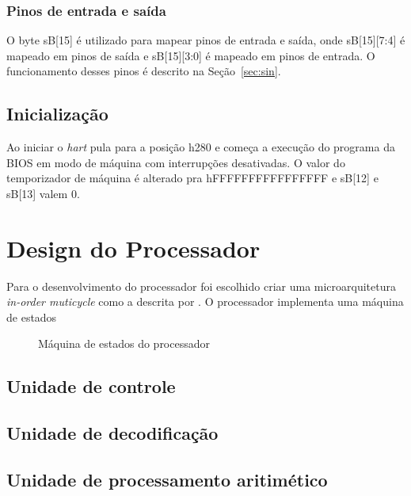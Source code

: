 \subsubsection{Pinos de entrada e saída}
\label{ssec:gpio}

O byte sB[15] é utilizado para mapear pinos de entrada e saída, onde sB[15][7:4] é mapeado em pinos de saída e sB[15][3:0] é mapeado em pinos de entrada.
O funcionamento desses pinos é descrito na Seção~\ref{sec:sin}.

\subsection{Inicialização}
\label{ssec:init}

Ao iniciar o \emph{hart} pula para a posição h280 e começa a execução do programa da BIOS em modo de máquina com interrupções desativadas.
O valor do temporizador de máquina é alterado pra hFFFFFFFFFFFFFFFF e sB[12] e sB[13] valem 0.

\section{Design do Processador}
\label{sec:ddp}

Para o desenvolvimento do processador foi escolhido criar uma microarquitetura \emph{in-order muticycle} como a descrita por \cite{harris2021digital}.
O processador implementa uma máquina de estados 

\begin{figure}
  \centering
  \caption{Máquina de estados do processador}\label{fig:graficos}
\end{figure}

\subsection{Unidade de controle}
\label{ssec:udc}

\subsection{Unidade de decodificação}
\label{ssec:decode}

\subsection{Unidade de processamento aritimético}
\label{ssec:upa}

